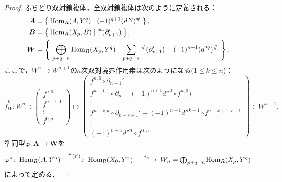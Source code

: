 \begin{proof}
  ふちどり双対鎖複体，全双対鎖複体は次のように定義される：
  \begin{align*}
    \boldsymbol{A} & = \Set{ \operatorname{Hom}_R(A, Y^q) \mid (-1)^{q+1}(d''^q)^\# }, \\
    \boldsymbol{B} & = \Set{ \operatorname{Hom}_R(X_p, B) \mid {}^\#(\partial_{p+1}') }, \\
    \boldsymbol{W} & = \Set{\left. \bigoplus_{p+q=n} \operatorname{Hom}_R(X_p, Y^q) ~\middle|~ \sum_{p+q=n} {}^\#(\partial_{p+1}') + (-1)^{n+1}(d''^q)^\# \right.} .
  \end{align*}
  ここで，$W^n \to W^{n+1}$の$n$次双対境界作用素は次のようになる($1 \leq k \leq n$)：
  \[ \tilde{f}_W^n \colon W^n \ni
  \begin{pmatrix}
    f^{n, 0} \\
    f^{n-1, 1} \\
    \vdots \\
    f^{0, n}
  \end{pmatrix}
  \mapsto
  \begin{pmatrix}
    f^{n, 0} \circ \partial_{n+1}' \\[10pt]
    f^{n-1, 1} \circ \partial_n + (-1)^{n+1} d''^0 \circ f^{n, 0}) \\
    \vdots \\
    f^{{n-k}, k}\circ \partial_{n-k+1}' + (-1)^{n+1}d''^{k-1} \circ f^{n-k+1, k-1} \\
    \vdots \\
    (-1)^{n+1} d''^n \circ f^{0, n}
  \end{pmatrix}
  \in W^{n+1}.
  \]
  準同型$\boldsymbol\varphi\colon \boldsymbol A \to \boldsymbol W$を
  \[
  \begin{CD}
    \varphi^n \colon \Hom_R(A, Y^n) @>{^\#(\varepsilon')}>> \Hom_R(X_0, Y^n) @>{i_n}>> W_n = \bigoplus_{p+q=n}\Hom_R(X_p, Y^q)
  \end{CD}
  \]
  によって定める．


\end{proof}

